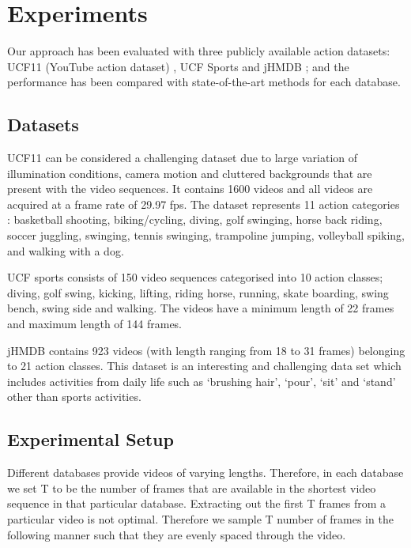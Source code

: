 \documentclass[10pt,twocolumn,letterpaper]{article}
\begin{document}

\section{Experiments}

Our approach has been evaluated with three publicly available action datasets: UCF11 (YouTube action dataset) \cite{UCF11wild}, UCF Sports \cite{UCFSports2008, UCFSports2014}  and jHMDB \cite{jHMDB2013}; and the performance has been compared with state-of-the-art methods for each database.   


\subsection{Datasets}

UCF11 can be considered a challenging dataset due to large variation of illumination conditions, camera motion and cluttered backgrounds that are present with the video sequences. It contains 1600 videos and all videos are acquired at a frame rate of 29.97 fps. The dataset represents 11 action categories : basketball shooting, biking/cycling, diving, golf swinging, horse back riding, soccer juggling, swinging, tennis swinging, trampoline jumping, volleyball spiking, and walking with a dog.

UCF sports consists of 150 video sequences categorised into 10 action classes; diving, golf swing, kicking, lifting, riding horse, running, skate boarding, swing bench, swing side and walking. The videos have a minimum length of 22 frames and maximum length of 144 frames. 

jHMDB contains 923 videos (with length ranging from 18 to 31 frames) belonging to 21 action classes. This dataset is an interesting and challenging data set which includes activities from daily life such as `brushing hair', `pour', `sit' and `stand' other than sports activities. 

\subsection{Experimental Setup}

Different databases provide videos of varying lengths. Therefore, in each database we set T to be the number of frames that are available in the shortest video sequence in that particular database. Extracting out the first T frames from a particular video is not optimal. Therefore we sample T number of frames in the following manner such that they are evenly spaced through the video.  
\end{document}

